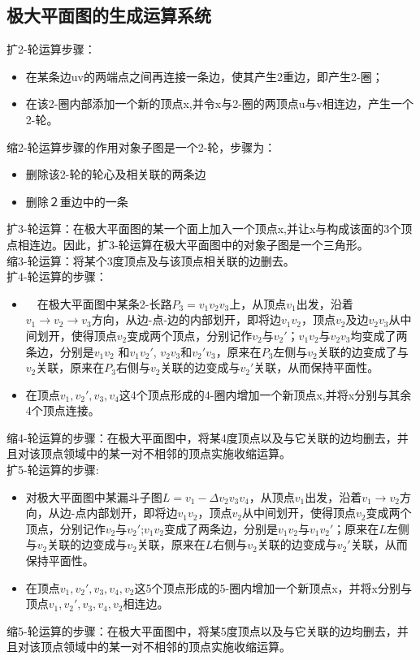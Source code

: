 \documentclass[12pt, UTF8]{ctexart}
\begin{document}
\subsection{极大平面图的生成运算系统}
扩2-轮运算步骤：
\begin{itemize}
    \item 在某条边uv的两端点之间再连接一条边，使其产生2重边，即产生2-圈；
    \item 在该2-圈内部添加一个新的顶点x,并令x与2-圈的两顶点u与v相连边，产生一个2-轮。
\end{itemize}
缩2-轮运算步骤的作用对象子图是一个2-轮，步骤为：
\begin{itemize}
    \item 删除该2-轮的轮心及相关联的两条边
    \item 删除２重边中的一条
\end{itemize}
扩3-轮运算：在极大平面图的某一个面上加入一个顶点x,并让x与构成该面的3个顶点相连边。因此，扩3-轮运算在极大平面图中的对象子图是一个三角形。\\
缩3-轮运算：将某个3度顶点及与该顶点相关联的边删去。\\
扩4-轮运算的步骤：
\begin{itemize}
    \item　在极大平面图中某条2-长路$P_3=v_1v_2v_3$上，从顶点$v_1$出发，沿着$v_1 \rightarrow v_2 \rightarrow v_3$方向，从边-点-边的内部划开，即将边$v_1v_2$，顶点$v_2$及边$v_2v_3$从中间划开，使得顶点$v_2$变成两个顶点，分别记作$v_2$与$v_2'$；$v_1v_2$与$v_2v_3$均变成了两条边，分别是$v_1v_2$ 和$v_1v_2'$, $v_2v_3$和$v_2'v_3$，原来在$P_3$左侧与$v_2$关联的边变成了与$v_2$关联，原来在$P_3$右侧与$v_2$关联的边变成与$v_2'$关联，从而保持平面性。
    \item 在顶点$v_1,v_2',v_3,v_4$这4个顶点形成的4-圈内增加一个新顶点x,并将x分别与其余4个顶点连接。
\end{itemize}
缩4-轮运算的步骤：在极大平面图中，将某4度顶点以及与它关联的边均删去，并且对该顶点领域中的某一对不相邻的顶点实施收缩运算。\\
扩5-轮运算的步骤:
\begin{itemize}
    \item 对极大平面图中某漏斗子图$L=v_1-\Delta v_2v_3v_4$，从顶点$v_1$出发，沿着$v_1 \rightarrow v_2$方向，从边-点内部划开，即将边$v_1v_2$，顶点$v_2$从中间划开，使得顶点$v_2$变成两个顶点，分别记作$v_2$与$v_2'$;$v_1v_2$变成了两条边，分别是$v_1v_2$与$v_1v_2'$；原来在$L$左侧与$v_2$关联的边变成与$v_2$关联，原来在$L$右侧与$v_2$关联的边变成与$v_2'$关联，从而保持平面性。
    \item 在顶点$v_1,v_2',v_3,v_4,v_2$这5个顶点形成的5-圈内增加一个新顶点x，并将x分别与顶点$v_1,v_2',v_3,v_4,v_2$相连边。
\end{itemize}
缩5-轮运算的步骤：在极大平面图中，将某5度顶点以及与它关联的边均删去，并且对该顶点领域中的某一对不相邻的顶点实施收缩运算。\\
\end{document}
